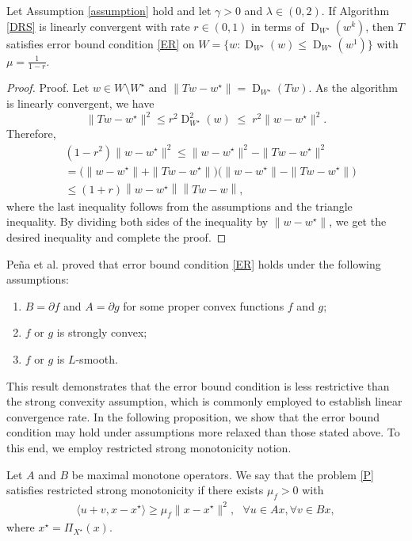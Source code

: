 \documentclass[ijoc,sglanonrev]{informs4}
\DeclareMathOperator{\dist}{D}
\begin{document}
\begin{proposition} \label{Th.LtoE}
Let Assumption \ref{assumption} hold and let $\gamma>0$ and $\lambda\in (0, 2)$. If Algorithm \ref{DRS} is linearly convergent with rate $r\in (0,1)$ in terms of $\dist_{W^\star}(w^k)$, then $T$ satisfies  error bound condition \eqref{ER} on $W=\{w: \dist_{W^\star}(w)\leq  \dist_{W^\star}(w^1)\}$ with 
$\mu=\frac{1}{1-r}$.
\end{proposition}
\begin{proof}{Proof.}
Let $w\in W\setminus W^\star$ and $\|Tw-w^\star\|=\dist_{W^\star}(Tw)$. As the algorithm is linearly convergent, we have
\[
\|Tw-w^\star\|^2\leq r^2\dist_{W^\star}^2(w) \;\le\; r^2\|w-w^\star\|^2.
\]
Therefore,
\begin{align*}
& (1-r^2)\|w-w^\star\|^2
\le \|w-w^\star\|^2-\|Tw-w^\star\|^2
\\
 &=  \bigl(\|w-w^\star\|+\|Tw-w^\star\|\bigr)\bigl(\|w-w^\star\|-\|Tw-w^\star\|\bigr)
 \\
 & \leq (1+r) \left\| w-w^\star \right\| \left\|  Tw-w \right\|,
\end{align*}
where the last inequality follows from the assumptions and the triangle inequality. 
By dividing both sides of the inequality by  $\|w-w^\star\|$, we get the desired inequality and complete the proof.
\Halmos
\end{proof}

Pe{\~n}a et al.\cite[Theorem 2]{pena2021linear} proved that  error bound condition \eqref{ER} holds under the following assumptions:
\begin{enumerate}[label=\roman*)]
 \item $B=\partial f$ and $A=\partial g$ for some proper convex functions $f$ and $g$;
\item  $f$ or $g$ is strongly convex;
\item  $f$ or $g$ is $L$-smooth.
\end{enumerate}

This result demonstrates that the error bound condition is less restrictive than the strong convexity assumption, which is commonly employed to establish linear convergence rate. In the following proposition, we show that the error bound condition may hold under assumptions more relaxed than those stated above. To this end, we employ restricted strong monotonicity notion.

\begin{definition}
Let $A$ and $B$ be maximal monotone operators. We say that the problem \eqref{P} satisfies restricted strong monotonicity if there exists $\mu_f> 0$ with
\begin{align}\label{Q_G_G_D}
\langle u+v, x-x^\star\rangle\ge \mu_f \|x-x^\star\|^2, \ \ \ 
\forall u\in Ax, \forall v\in Bx,
\end{align}
where $x^\star=\Pi_{X^\star}(x)$.
\end{definition}
\end{document}
